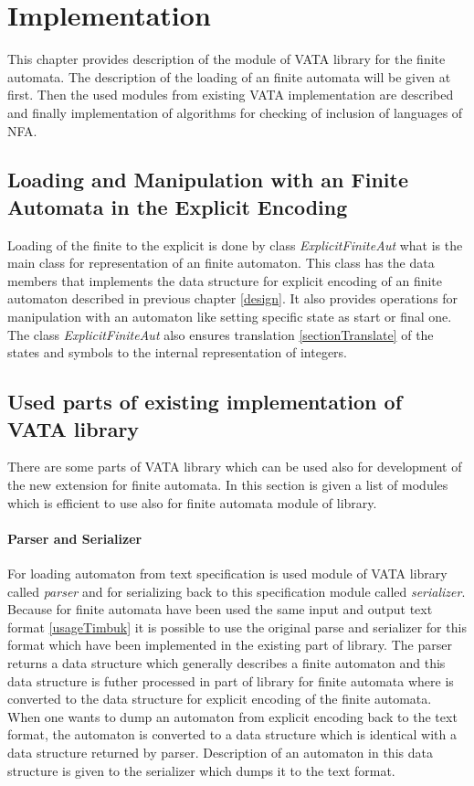 \chapter{Implementation}
\label{implementation}
This chapter provides description of the module of VATA library for the finite automata. The description of the loading of an finite
automata will be given at first. Then the used modules from existing VATA implementation are described and finally implementation of algorithms
for checking of inclusion of languages of NFA.

\section{Loading and Manipulation with an Finite Automata in the Explicit Encoding}
Loading of the finite to the explicit is done by class \emph{ExplicitFiniteAut} what is the main class for representation of an finite automaton. 
This class has the data members that implements the data structure for explicit encoding of an finite automaton described in previous chapter \ref{design}. 
It also provides operations for manipulation with an automaton like setting specific state as start or final one.
The class \emph{ExplicitFiniteAut} also ensures translation \ref{sectionTranslate} of the states and symbols to the internal representation of integers. 

\section{Used parts of existing implementation of VATA library}
There are some parts of VATA library which can be used also for development of the new extension for finite automata. In this section is given a list of modules
which is efficient to use also for finite automata module of library.

\subsubsection{Parser and Serializer}
For loading automaton from text specification is used module of VATA library called \emph{parser} and for serializing back to this specification module called
\emph{serializer}.
Because for finite automata have been used the same input and output text format \ref{usageTimbuk} 
it is possible to use the original parse and serializer for this 
format which have been implemented in the existing part of library. 
The parser returns a data structure which generally describes a finite automaton and this data structure is futher processed in part of library for 
finite automata where is converted to the data structure for explicit encoding of the finite automata. When one wants to dump an automaton from explicit encoding
back to the text format, the automaton is converted to a data structure which is identical with a data structure returned by parser. 
Description of an automaton in this
data structure is given to the serializer which dumps it to the text format.

